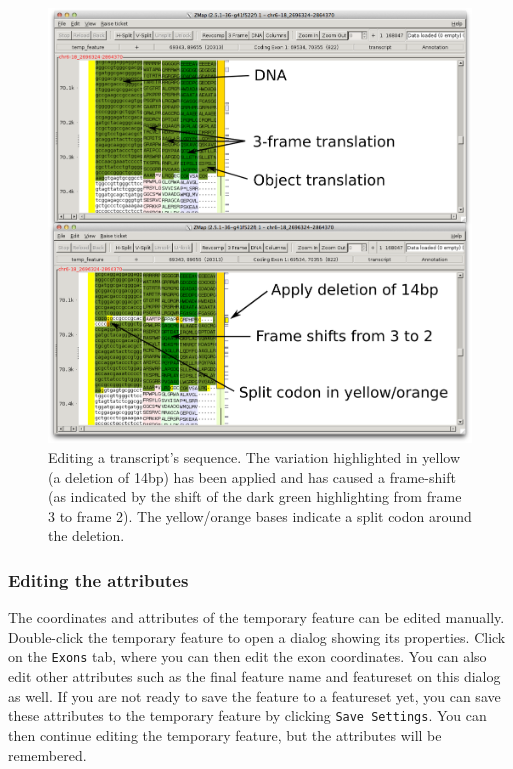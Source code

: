 \documentclass[letterpaper]{article}
\begin{document}
\begin{figure}
\centering
\color[rgb]{0.30980393,0.5058824,0.7411765}
\includegraphics[width=15.231cm]{img_edit_sequence.png}
\caption{Editing a transcript's sequence. The variation highlighted in yellow (a deletion of 14bp) has been applied and has caused a frame-shift (as indicated by the shift of the dark green highlighting from frame 3 to frame 2). The yellow/orange bases indicate a split codon around the deletion.}
\label{img_edit_sequence}
\end{figure}

\subsubsection{Editing the attributes} \label{sec_annotation_attributes}
The coordinates and attributes of the temporary feature can be edited manually. Double-click the temporary feature to open a dialog showing its properties. Click on the \lstinline{Exons} tab, where you can then edit the exon coordinates. You can also edit other attributes such as the final feature name and featureset on this dialog as well. If you are not ready to save the feature to a featureset yet, you can save these attributes to the temporary feature by clicking \lstinline{Save Settings}. You can then continue editing the temporary feature, but the attributes will be remembered.
\end{document}
